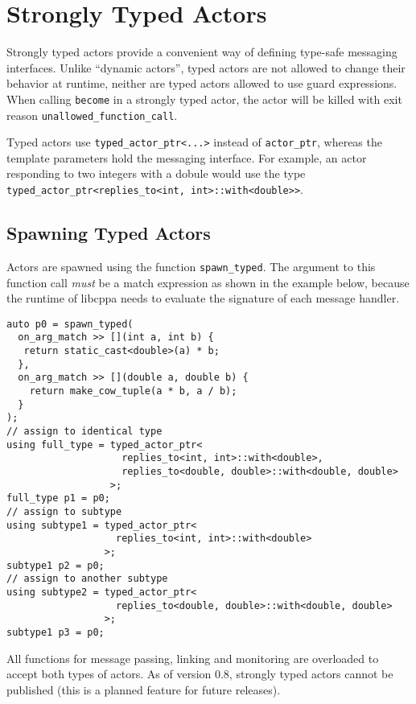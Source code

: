 \section{Strongly Typed Actors}

Strongly typed actors provide a convenient way of defining type-safe messaging interfaces.
Unlike ``dynamic actors'', typed actors are not allowed to change their behavior at runtime, neither are typed actors allowed to use guard expressions.
When calling \lstinline^become^ in a strongly typed actor, the actor will be killed with exit reason \lstinline^unallowed_function_call^.

Typed actors use \lstinline^typed_actor_ptr<...>^ instead of \lstinline^actor_ptr^, whereas the template parameters hold the messaging interface.
For example, an actor responding to two integers with a dobule would use the type \lstinline^typed_actor_ptr<replies_to<int, int>::with<double>>^.

\subsection{Spawning Typed Actors}
\label{sec:strong:spawn}

Actors are spawned using the function \lstinline^spawn_typed^.
The argument to this function call \emph{must} be a match expression as shown in the example below, because the runtime of libcppa needs to evaluate the signature of each message handler.

\begin{lstlisting}
auto p0 = spawn_typed(
  on_arg_match >> [](int a, int b) {
   return static_cast<double>(a) * b;
  },
  on_arg_match >> [](double a, double b) {
    return make_cow_tuple(a * b, a / b);
  }
);
// assign to identical type
using full_type = typed_actor_ptr<
                    replies_to<int, int>::with<double>,
                    replies_to<double, double>::with<double, double>
                  >;
full_type p1 = p0;
// assign to subtype
using subtype1 = typed_actor_ptr<
                   replies_to<int, int>::with<double>
                 >;
subtype1 p2 = p0;
// assign to another subtype
using subtype2 = typed_actor_ptr<
                   replies_to<double, double>::with<double, double>
                 >;
subtype1 p3 = p0;
\end{lstlisting}

All functions for message passing, linking and monitoring are overloaded to accept both types of actors.
As of version 0.8, strongly typed actors cannot be published (this is a planned feature for future releases).